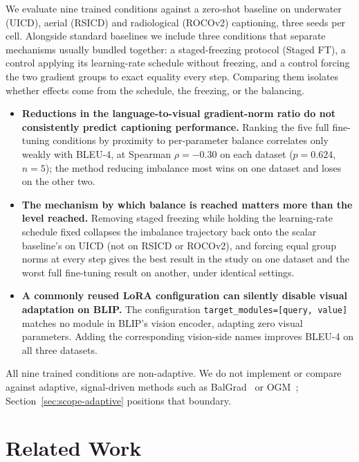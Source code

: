 \documentclass[journal]{IEEEtran}
\begin{document}
We evaluate nine trained conditions against a zero-shot baseline on underwater (UICD), aerial (RSICD) and radiological (ROCOv2)
captioning, three seeds per cell. Alongside standard baselines we
include three conditions that separate mechanisms usually bundled
together: a staged-freezing protocol (Staged FT), a control applying its learning-rate schedule without freezing, and a control forcing the two gradient groups to exact equality every step. Comparing them isolates whether effects come from the schedule, the freezing, or the balancing.

\begin{itemize}
     \item \textbf{Reductions in the language-to-visual
    gradient-norm ratio do not consistently predict captioning
    performance.} Ranking the five full fine-tuning conditions by
    proximity to per-parameter balance correlates only weakly with
    BLEU-4, at Spearman $\rho = -0.30$ on each dataset ($p=0.624$,
    $n{=}5$); the method reducing imbalance most wins on one dataset and loses on the other two.

    \item \textbf{The mechanism by which balance is reached
    matters more than the level reached.} Removing staged freezing while holding the learning-rate schedule fixed collapses the imbalance trajectory back onto the scalar baseline's on UICD (not on RSICD or ROCOv2), and forcing equal group norms at every step gives the best result in the study on one dataset and the worst full fine-tuning result on another, under identical settings.

    \item \textbf{A commonly reused LoRA configuration can
    silently disable visual adaptation on BLIP.} The
    configuration \texttt{target\_modules=[query, value]} matches
    no module in BLIP's vision encoder, adapting zero visual
    parameters. Adding the corresponding vision-side names improves BLEU-4 on all three datasets.
\end{itemize}
All nine trained conditions are non-adaptive. We do not implement or compare against adaptive, signal-driven methods such as
BalGrad~\cite{gim2025seesaw} or OGM~\cite{peng2022ogm,wei2024onthefly};
Section~\ref{sec:scope-adaptive} positions that boundary.
\section{Related Work}
\label{sec:related}
\end{document}
